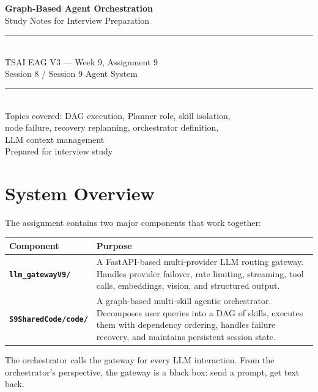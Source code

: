 \documentclass[12pt,a4paper]{article}
\begin{document}
\begin{titlepage}
  \centering
  \vspace*{3cm}
  {\Huge\bfseries Graph-Based Agent Orchestration\\[0.5em]}
  {\Large Study Notes for Interview Preparation\\[2em]}
  \rule{10cm}{0.5pt}\\[1.5em]
  {\large TSAI EAG V3 — Week 9, Assignment 9}\\[0.5em]
  {\large Session 8 / Session 9 Agent System}\\[2em]
  \rule{10cm}{0.5pt}\\[1.5em]
  {\normalsize Topics covered: DAG execution, Planner role, skill isolation,\\
  node failure, recovery replanning, orchestrator definition,\\
  LLM context management}\\[3cm]
  {\small Prepared for interview study}
\end{titlepage}

\tableofcontents
\newpage

\section{System Overview}

The assignment contains two major components that work together:

\begin{center}
\begin{tabular}{>{\bfseries}p{4.5cm} p{9cm}}
\toprule
Component & Purpose \\
\midrule
\texttt{llm\_gatewayV9/} & A FastAPI-based multi-provider LLM routing gateway.
  Handles provider failover, rate limiting, streaming, tool calls, embeddings,
  vision, and structured output. \\[0.5em]
\texttt{S9SharedCode/code/} & A graph-based multi-skill agentic orchestrator.
  Decomposes user queries into a DAG of skills, executes them with dependency
  ordering, handles failure recovery, and maintains persistent session state. \\
\bottomrule
\end{tabular}
\end{center}

The orchestrator calls the gateway for every LLM interaction. From the
orchestrator's perspective, the gateway is a black box: send a prompt, get text
back.
\end{document}
